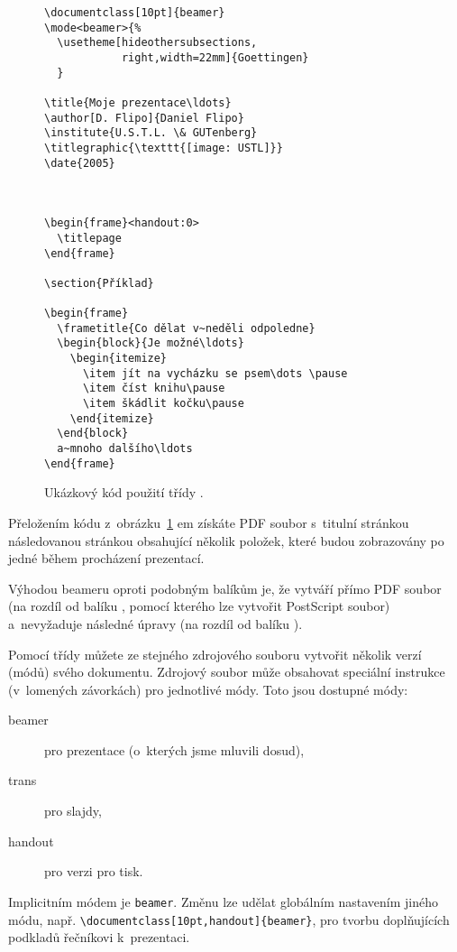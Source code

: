 \begin{figure}[htbp]
\begin{verbatim}
\documentclass[10pt]{beamer}
\mode<beamer>{%
  \usetheme[hideothersubsections,
            right,width=22mm]{Goettingen}
  }

\title{Moje prezentace\ldots}
\author[D. Flipo]{Daniel Flipo}
\institute{U.S.T.L. \& GUTenberg}
\titlegraphic{\texttt{[image: USTL]}}
\date{2005}



\begin{frame}<handout:0>
  \titlepage
\end{frame}

\section{Příklad}

\begin{frame}
  \frametitle{Co dělat v~neděli odpoledne}
  \begin{block}{Je možné\ldots}
    \begin{itemize}
      \item jít na vycházku se psem\dots \pause
      \item číst knihu\pause
      \item škádlit kočku\pause
    \end{itemize}
  \end{block}
  a~mnoho dalšího\ldots
\end{frame}

\end{verbatim}
  \caption{Ukázkový kód použití třídy .}
  \label{fig:code-beamer}
\end{figure}

Přeložením kódu z~obrázku~\ref{fig:code-beamer} %
\pdfLaTeX em
získáte PDF soubor s~titulní stránkou následovanou stránkou
obsahující několik položek, které budou zobrazovány po jedné
během procházení prezentací.

Výhodou \textsf{beameru} oproti podobným balíkům je, že vytváří přímo PDF
soubor (na rozdíl od balíku , pomocí kterého lze vytvořit
PostScript soubor) a~nevyžaduje následné úpravy (na rozdíl od balíku
).

Pomocí třídy  můžete ze stejného zdrojového souboru vytvořit
několik verzí (módů) svého dokumentu. Zdrojový soubor může obsahovat
speciální instrukce (v~lomených závorkách) pro jednotlivé módy.
Toto jsou dostupné módy:
\begin{description}
\item[beamer] pro prezentace (o~kterých jsme mluvili dosud),
\item[trans] pro slajdy,
\item[handout] pro verzi pro tisk.
\end{description}
Implicitním módem je \texttt{beamer}. Změnu lze udělat globálním
nastavením jiného módu, např.
\verb|\documentclass[10pt,handout]{beamer}|, pro tvorbu doplňujících podkladů řečníkovi k~prezentaci. %

